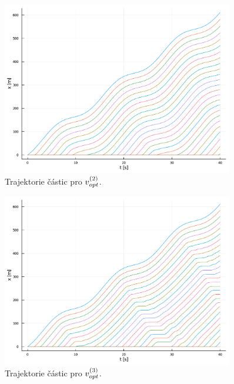\documentclass[a4paper, 12pt, fleqn]{article}
\begin{document}
\begin{figure}
	\centering
	\includegraphics[width=0.9\textwidth]{images/trajektorie_2.pdf}
	\caption{Trajektorie částic pro $v_{opt}^{(2)}$.}
	\label{Obr: Trajektorie 2}
\end{figure}

\begin{figure}
	\centering
	\includegraphics[width=0.9\textwidth]{images/trajektorie_5.pdf}
	\caption{Trajektorie částic pro $v_{opt}^{(3)}$.}
	\label{Obr: Trajektorie 3}
\end{figure}
\end{document}
